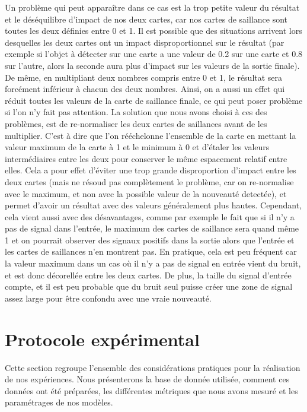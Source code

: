	Un problème qui peut apparaître dans ce cas est la trop petite valeur du résultat et le déséquilibre d'impact de nos deux cartes, car nos cartes de saillance sont toutes les deux définies entre 0 et 1. Il est possible que des situations arrivent lors desquelles les deux cartes ont un impact disproportionnel sur le résultat (par exemple si l'objet à détecter sur une carte a une valeur de 0.2 sur une carte et 0.8 sur l'autre, alors la seconde aura plus d'impact sur les valeurs de la sortie finale). De même, en multipliant deux nombres compris entre 0 et 1, le résultat sera forcément inférieur à chacun des deux nombres. Ainsi, on a aussi un effet qui réduit toutes les valeurs de la carte de saillance finale, ce qui peut poser problème si l'on n'y fait pas attention. La solution que nous avons choisi à ces des problèmes, est de re-normaliser les deux cartes de saillances avant de les multiplier. C'est à dire que l'on rééchelonne l'ensemble de la carte en mettant la valeur maximum de la carte à 1 et le minimum à 0 et d'étaler les valeurs intermédiaires entre les deux pour conserver le même espacement relatif entre elles. Cela a pour effet d'éviter une trop grande disproportion d'impact entre les deux cartes (mais ne résoud pas complètement le problème, car on re-normalise avec le maximum, et non avec la possible valeur de la nouveauté detectée), et permet d'avoir un résultat avec des valeurs généralement plus hautes. Cependant, cela vient aussi avec des désavantages, comme par exemple le fait que si il n'y a pas de signal dans l'entrée, le maximum des cartes de saillance sera quand même 1 et on pourrait observer des signaux positifs dans la sortie alors que l'entrée et les cartes de saillances n'en montrent pas. En pratique, cela est peu fréquent car la valeur maximum dans un cas où il n'y a pas de signal en entrée vient du bruit, et est donc décorellée entre les deux cartes. De plus, la taille du signal d'entrée compte, et il est peu probable que du bruit seul puisse créer une zone de signal assez large pour être confondu avec une vraie nouveauté.

	\newpage
	\section{Protocole expérimental}

	Cette section regroupe l'ensemble des considérations pratiques pour la réalisation de nos expériences. Nous présenterons la base de donnée utilisée, comment ces données ont été préparées, les différentes métriques que nous avons mesuré et les paramétrages de nos modèles.

